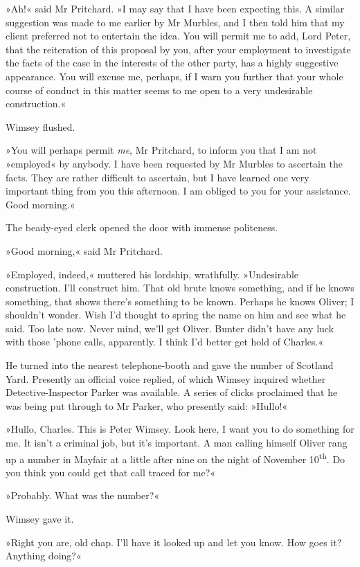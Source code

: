 »Ah!« said Mr Pritchard. »I may say that I have been expecting this. A similar suggestion was made to me earlier by Mr Murbles, and I then told him that my client preferred not to entertain the idea. You will permit me to add, Lord Peter, that the reiteration of this proposal by you, after your employment to investigate the facts of the case in the interests of the other party, has a highly suggestive appearance. You will excuse me, perhaps, if I warn you further that your whole course of conduct in this matter seems to me open to a very undesirable construction.«

Wimsey flushed.

»You will perhaps permit \textit{me}, Mr Pritchard, to inform you that I am not »employed« by anybody. I have been requested by Mr Murbles to ascertain the facts. They are rather difficult to ascertain, but I have learned one very important thing from you this afternoon. I am obliged to you for your assistance. Good morning.«

The beady-eyed clerk opened the door with immense politeness.

»Good morning,« said Mr Pritchard.

»Employed, indeed,« muttered his lordship, wrathfully. »Undesirable construction. I'll construct him. That old brute knows something, and if he knows something, that shows there's something to be known. Perhaps he knows Oliver; I shouldn't wonder. Wish I'd thought to spring the name on him and see what he said. Too late now. Never mind, we'll get Oliver. Bunter didn't have any luck with those 'phone calls, apparently. I think I'd better get hold of Charles.«

He turned into the nearest telephone-booth and gave the number of Scotland Yard. Presently an official voice replied, of which Wimsey inquired whether Detective-Inspector Parker was available. A series of clicks proclaimed that he was being put through to Mr Parker, who presently said: »Hullo!«

»Hullo, Charles. This is Peter Wimsey. Look here, I want you to do something for me. It isn't a criminal job, but it's important. A man calling himself Oliver rang up a number in Mayfair at a little after nine on the night of November  10\textsuperscript{th}. Do you think you could get that call traced for me?«

»Probably. What was the number?«

Wimsey gave it.

»Right you are, old chap. I'll have it looked up and let you know. How goes it? Anything doing?«

